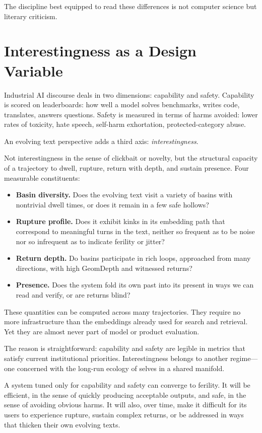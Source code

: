 \documentclass[12pt,a4paper]{article}
\begin{document}
The discipline best equipped to read these differences is not computer science but literary criticism.

\section{Interestingness as a Design Variable}

Industrial AI discourse deals in two dimensions: capability and safety. Capability is scored on leaderboards: how well a model solves benchmarks, writes code, translates, answers questions. Safety is measured in terms of harms avoided: lower rates of toxicity, hate speech, self-harm exhortation, protected-category abuse.

An evolving text perspective adds a third axis: \emph{interestingness}.

Not interestingness in the sense of clickbait or novelty, but the structural capacity of a trajectory to dwell, rupture, return with depth, and sustain presence. Four measurable constituents:

\begin{itemize}
  \item \textbf{Basin diversity.} Does the evolving text visit a variety of basins with nontrivial dwell times, or does it remain in a few safe hollows?
  \item \textbf{Rupture profile.} Does it exhibit kinks in its embedding path that correspond to meaningful turns in the text, neither so frequent as to be noise nor so infrequent as to indicate ferility or jitter?
  \item \textbf{Return depth.} Do basins participate in rich loops, approached from many directions, with high GeomDepth and witnessed returns?
  \item \textbf{Presence.} Does the system fold its own past into its present in ways we can read and verify, or are returns blind?
\end{itemize}

These quantities can be computed across many trajectories. They require no more infrastructure than the embeddings already used for search and retrieval. Yet they are almost never part of model or product evaluation.

The reason is straightforward: capability and safety are legible in metrics that satisfy current institutional priorities. Interestingness belongs to another regime---one concerned with the long-run ecology of selves in a shared manifold.

A system tuned only for capability and safety can converge to ferility. It will be efficient, in the sense of quickly producing acceptable outputs, and safe, in the sense of avoiding obvious harms. It will also, over time, make it difficult for its users to experience rupture, sustain complex returns, or be addressed in ways that thicken their own evolving texts.
\end{document}
